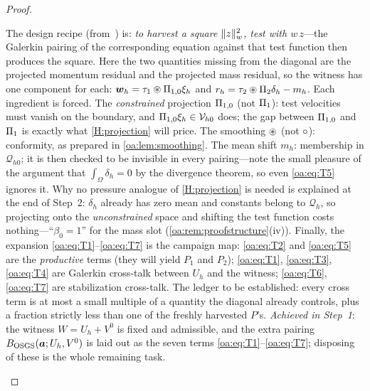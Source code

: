 \begin{proof}
\begin{pedagogy}
The design recipe (from~\cite{codina2008analysis}) is: \emph{to harvest a
square $\lVert z \rVert_w^2$, test with $w\,z$}---the Galerkin pairing of the
corresponding equation against that test function then produces the square.
Here the two quantities missing from the diagonal are the projected momentum
residual and the projected mass residual, so the witness has one component for
each: $\boldsymbol{w}_h = \tau_1\circledast\Pi_{1,0}\xi_h$ and $r_h = \tau_2\circledast\Pi_{2}\delta_h -
m_h$. Each ingredient is forced. The \emph{constrained} projection $\Pi_{1,0}$
(not $\Pi_{1}$): test velocities must vanish on the boundary, and
$\Pi_{1,0}\xi_h \in \mathcal{V}_{h0}$ does; the gap between $\Pi_{1,0}$ and $\Pi_{1}$ is exactly
what \cref{H:projection} will price. The smoothing $\circledast$ (not $\circ$):
conformity, as prepared in \cref{oa:lem:smoothing}. The mean shift $m_h$:
membership in $\mathcal{Q}_{h0}$; it is then checked to be invisible in every
pairing---note the small pleasure of the argument that $\int_\Omega\delta_h = 0$
by the divergence theorem, so even \cref{oa:eq:T5} ignores it. Why no pressure
analogue of \cref{H:projection} is needed is explained at the end of Step~2:
$\delta_h$ already has zero mean and constants belong to $\mathcal{Q}_h$, so projecting
onto the \emph{unconstrained} space and shifting the test function costs
nothing---``$\beta_0 = 1$'' for the mass slot
(\cref{oa:rem:proofstructure}(iv)). Finally, the expansion
\cref{oa:eq:T1}--\cref{oa:eq:T7} is the campaign map: \cref{oa:eq:T2} and
\cref{oa:eq:T5} are the \emph{productive} terms (they will yield $P_1$ and
$P_2$); \cref{oa:eq:T1}, \cref{oa:eq:T3}, \cref{oa:eq:T4} are Galerkin
cross-talk between $U_h$ and the witness; \cref{oa:eq:T6}, \cref{oa:eq:T7} are
stabilization cross-talk. The ledger to be established: every cross term is at
most a small multiple of a quantity the diagonal already controls, plus a
fraction strictly less than one of the freshly harvested $P$'s.
\emph{Achieved in Step~1}: the witness $W = U_h + V^0$ is fixed and admissible, and
the extra pairing $B_{\mathrm{OSGS}}(\boldsymbol{a};U_h,V^0)$ is laid out as the seven terms
\cref{oa:eq:T1}--\cref{oa:eq:T7}; disposing of these is the whole remaining task.
\end{pedagogy}


\end{proof}
